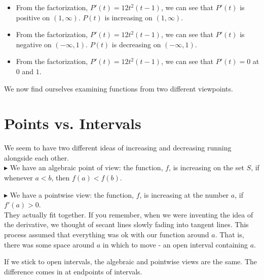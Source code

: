\documentclass{ximera}
\begin{document}
\begin{example}
\begin{explanation}
\begin{itemize}
\item From the factorization, $P'(t) = 12 t^2 (t-1)$, we can see that $P'(t)$ is positive on $(1, \infty)$. $P(t)$ is increasing on $(1, \infty)$. \\
\item From the factorization, $P'(t) = 12 t^2 (t-1)$, we can see that $P'(t)$ is negative on $(-\infty, 1)$. $P(t)$ is decreasing on $(-\infty, 1)$. \\
\item From the factorization, $P'(t) = 12 t^2 (t-1)$, we can see that $P'(t) = 0$ at $0$ and $1$. \\
\end{itemize}


\end{explanation}
\end{example}

We now find ourselves examining functions from two different viewpoints. \\



\section{ Points vs. Intervals}




We seem to have two different ideas of increasing and decreasing running alongside each other. \\



\textbf{\textcolor{red!90!darkgray}{$\blacktriangleright$}} We have an algebraic point of view: the function, $f$, is increasing on the set $S$, if whenever $a < b$, then $f(a) < f(b)$.



\textbf{\textcolor{red!90!darkgray}{$\blacktriangleright$}} We have a pointwise view: the function, $f$, is increasing at the number $a$, if $f'(a) > 0$. \\



They actually fit together. If you remember, when we were inventing the idea of the derivative, we thought of secant lines slowly fading into tangent lines.  This process assumed that everything was ok with our function around $a$.  That is, there was some space around $a$ in which to move - an open interval containing $a$.

If we stick to open intervals, the algebraic and pointwise views are the same.  The difference comes in at endpoints of intervals. \\
\end{document}
